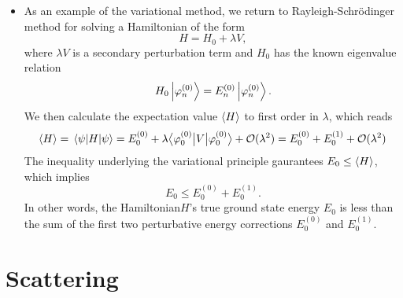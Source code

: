 \documentclass[11pt, a4paper]{article}
\newcommand{\Schro}{Schr\"{o}dinger\xspace}
\newcommand{\Ham}{Hamiltonian\xspace}
\newcommand{\bmel}[3]{\big \langle {#1} \big | {#2} \big | {#3} \big \rangle}  %
\begin{document}
\begin{itemize}
    \item As an example of the variational method, we return to Rayleigh-\Schro method for solving a \Ham of the form
    \begin{equation*}
        H = H_{0} + \lambda V,
    \end{equation*}
    where $ \lambda V $ is a secondary perturbation term and $ H_{0} $ has the known eigenvalue relation
    \begin{equation*}
        H_{0} \ket{\varphi_{n}^{(0)}} = E_{n}^{(0)}\ket{\varphi_{n}^{(0)}}.
    \end{equation*}
    We then calculate the expectation value $ \ev{H} $ to first order in $ \lambda $, which reads
    \begin{equation*}
        \ev{H} = \mel{\psi}{H}{\psi} = E_{0}^{(0)} + \lambda \bmel{\varphi_{0}^{(0)}}{V}{\varphi_{0}^{(0)}} + \mathcal{O}(\lambda^{2}) = E_{0}^{(0)} + E_{0}^{(1)} + \mathcal{O}(\lambda^{2})
    \end{equation*}
    The inequality underlying the variational principle gaurantees $ E_{0} \leq \ev{H} $, which implies
    \begin{equation*}
        E_{0} \leq E_{0}^{(0)} + E_{0}^{(1)}.
    \end{equation*}
    In other words, the \Ham $ H $'s true ground state energy $ E_{0} $ is less than the sum of the first two perturbative energy corrections $ E_{0}^{(0)} $ and $ E_{0}^{(1)} $.
    
\end{itemize}

\section{Scattering}
\end{document}
